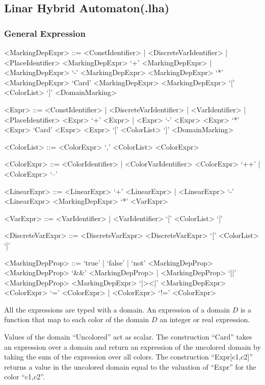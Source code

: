 \documentclass{article}
\begin{document}
\subsection{Linar Hybrid Automaton(.lha)}


\subsubsection{General Expression}

\begin{scriptsize}
\begin{grammar}
  <MarkingDepExpr> ::= <ConstIdentifier> | <DiscreteVarIdentifier> | <PlaceIdentifier>
  \alt  <MarkingDepExpr> `+'  <MarkingDepExpr> | <MarkingDepExpr> `-'  <MarkingDepExpr>
  \alt  <MarkingDepExpr> `*'  <MarkingDepExpr>
  \alt `Card' <MarkingDepExpr>
  \alt <MarkingDepExpr> `[' <ColorList> `]'
  \alt <DomainMarking>

 <Expr> ::= <ConstIdentifier> | <DiscreteVarIdentifier>  | <VarIdentifier> | <PlaceIdentifier>
  \alt  <Expr> `+'  <Expr> | <Expr> `-'  <Expr>
  \alt  <Expr> `*'  <Expr>
  \alt `Card' <Expr>
  \alt <Expr> `[' <ColorList> `]'
  \alt <DomainMarking>

  <ColorList> ::= <ColorExpr> `,' <ColorList>
  \alt <ColorExpr>

  <ColorExpr> ::= <ColorIdentifier> | <ColorVarIdentifier>
  \alt <ColorExpr> `++' | <ColorExpr> `--'

  <LinearExpr> ::= <LinearExpr> `+'  <LinearExpr> | <LinearExpr> `-'  <LinearExpr>
  \alt <MarkingDepExpr> `*' <VarExpr>

  <VarExpr> ::= <VarIdentifier> | <VarIdentifier> `[' <ColorList> `]'

  <DiscreteVarExpr> ::= <DiscreteVarExpr> \alt <DiscreteVarExpr> `[' <ColorList> `]'

<MarkingDepProp> ::= `true' | `false' | `not' <MarkingDepProp>
  \alt <MarkingDepProp> `\&\&' <MarkingDepProp> |  <MarkingDepProp> `||' <MarkingDepProp>
  \alt <MarkingDepExpr> `|\!\!>\!<\!\!|' <MarkingDepExpr>  
  \alt <ColorExpr> `=' <ColorExpr> | <ColorExpr> `!=' <ColorExpr>

\end{grammar}
\end{scriptsize}

All the expressions are typed with a domain. An expression of a domain
$D$ is a function that map to each color of the domain $D$ an integer
or real expression. 

Values of the domain ``Uncolored'' act as scalar.  The construction
``Card'' takes an expression over a domain and return an expression of
the uncolored domain by taking the sum of the expression over all
colors. The construction ``Expr[c1,c2]'' returns a value in the
uncolored domain equal to the valuation of ``Expr'' for the color
``c1,c2''.
\end{document}
